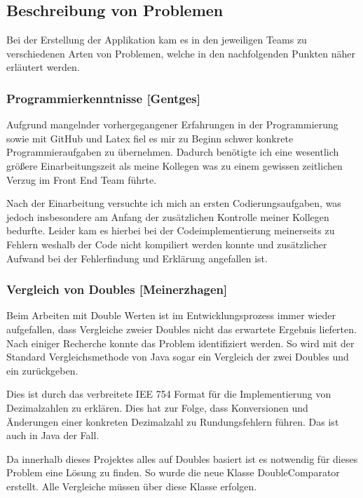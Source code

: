 {\clearpage

\subsection{Beschreibung von Problemen}

Bei der Erstellung der Applikation kam es in den jeweiligen Teams zu verschiedenen Arten von Problemen, welche in den nachfolgenden Punkten näher erläutert werden.

\subsubsection{Programmierkenntnisse [Gentges]}

Aufgrund mangelnder vorhergegangener Erfahrungen in der Programmierung sowie mit GitHub und Latex fiel es mir zu Beginn schwer konkrete Programmieraufgaben zu übernehmen. Dadurch benötigte ich eine wesentlich größere Einarbeitungszeit als meine Kollegen was zu einem gewissen zeitlichen Verzug im Front End Team führte.

Nach der Einarbeitung versuchte ich mich an ersten Codierungsaufgaben, was jedoch insbesondere am Anfang der zusätzlichen Kontrolle meiner Kollegen bedurfte. 
Leider kam es hierbei bei der Codeimplementierung meinerseits zu Fehlern weshalb der Code nicht kompiliert werden konnte und zusätzlicher Aufwand bei der Fehlerfindung und Erklärung angefallen ist. 

\subsubsection{Vergleich von Doubles [Meinerzhagen]}
Beim Arbeiten mit Double Werten ist im Entwicklungsprozess immer wieder aufgefallen, dass Vergleiche zweier Doubles nicht das erwartete Ergebnis lieferten. Nach einiger Recherche konnte das Problem identifiziert werden. So wird mit der Standard Vergleichsmethode von Java sogar ein  Vergleich der zwei Doubles  und  ein  zurückgeben.

Dies ist durch das verbreitete IEE 754 Format für die Implementierung von Dezimalzahlen zu erklären. Dies hat zur Folge, dass Konversionen und Änderungen einer konkreten Dezimalzahl zu Rundungsfehlern führen. Das ist auch in Java der Fall.

Da innerhalb dieses Projektes alles auf Doubles basiert ist es notwendig für dieses Problem eine Lösung zu finden. So wurde die neue Klasse DoubleComparator erstellt. Alle Vergleiche müssen über diese Klasse erfolgen.

}
